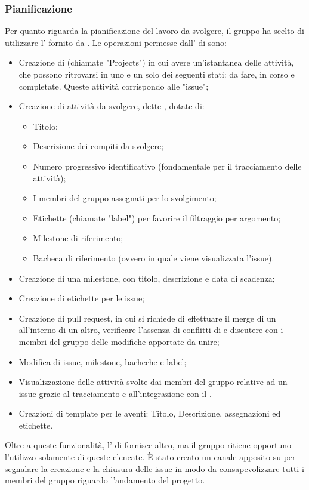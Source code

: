 \subsubsection{Pianificazione}
Per quanto riguarda la pianificazione del lavoro da svolgere, il gruppo \Gruppo{} ha scelto di utilizzare l' fornito da .
Le operazioni permesse dall' di  sono:
\begin{itemize}
	\item Creazione di  (chiamate "Projects") in cui avere un'istantanea delle attività, che possono ritrovarsi in uno e un solo dei seguenti stati: da fare, in corso e completate. Queste attività corrispondo alle "issue";
	\item Creazione di attività da svolgere, dette , dotate di:
	\begin{itemize}
		\item Titolo;
		\item Descrizione dei compiti da svolgere;
		\item Numero progressivo identificativo (fondamentale per il tracciamento delle attività);
		\item I membri del gruppo assegnati per lo svolgimento;
		\item Etichette (chiamate "label") per favorire il filtraggio per argomento;
		\item Milestone di riferimento;
		\item Bacheca di riferimento (ovvero in quale  viene visualizzata l'issue).
	\end{itemize}
	\item Creazione di una milestone, con titolo, descrizione e data di scadenza;
	\item Creazione di etichette per le issue;
	\item Creazione di pull request, in cui si richiede di effettuare il merge di un  all'interno di un altro, verificare l'assenza di conflitti di  e discutere con i membri del gruppo delle modifiche apportate da unire;
	\item Modifica di issue, milestone, bacheche e label;
	\item Visualizzazione delle attività svolte dai membri del gruppo relative ad un issue grazie al tracciamento e all'integrazione con il  .
	\item Creazioni di template per le  aventi: Titolo, Descrizione, assegnazioni ed etichette.
\end{itemize}
Oltre a queste funzionalità, l' di  fornisce altro, ma il gruppo \Gruppo{} ritiene opportuno l'utilizzo solamente di queste elencate.
È stato creato un canale apposito su  per segnalare la creazione e la chiusura delle issue in modo da consapevolizzare tutti i membri del gruppo riguardo l'andamento del progetto.

